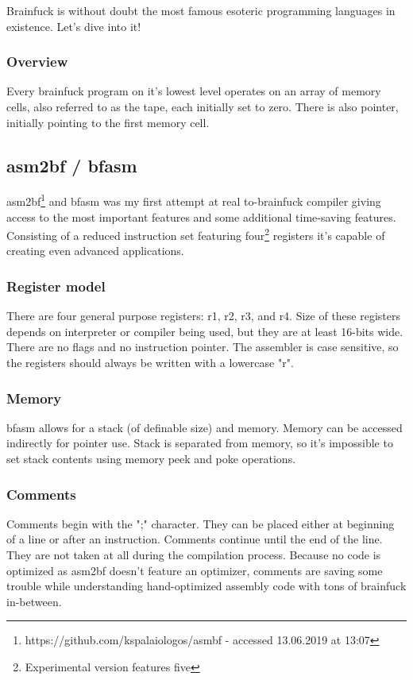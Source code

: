 \documentclass{article}
\begin{document}
\par Brainfuck is without doubt the most famous esoteric programming languages in existence. Let's dive into it!

\subsubsection{Overview}

\par Every brainfuck program on it's lowest level operates on an array of memory cells, also referred to as the tape, each initially set to zero. There is also pointer, initially pointing to the first memory cell.

\subsection{asm2bf / bfasm}
\par asm2bf\footnote{https://github.com/kspalaiologos/asmbf - accessed 13.06.2019 at 13:07} and bfasm was my first attempt at real to-brainfuck compiler giving access to the most important features and some additional time-saving features. Consisting of a reduced instruction set featuring four\footnote{Experimental version features five} registers it's capable of creating even advanced applications.

\subsubsection{Register model}
\par There are four general purpose registers: r1, r2, r3, and r4. Size of these registers depends on
interpreter or compiler being used, but they are at least 16-bits wide. There are no flags and no
instruction pointer. The assembler is case sensitive, so the registers should always be written with
a lowercase "r".

\subsubsection{Memory}
\par bfasm allows for a stack (of definable size) and memory. Memory can be accessed indirectly for pointer use. Stack is separated from memory, so it's impossible to set stack contents using memory peek and poke operations.

\subsubsection{Comments}
\par Comments begin with the ";" character. They can be placed either at beginning of a line or after an instruction. Comments continue until the end of the line. They are not taken at all during the compilation process. Because no code is optimized as asm2bf doesn't feature an optimizer, comments are saving some trouble while understanding hand-optimized assembly code with tons of brainfuck in-between.
\end{document}

